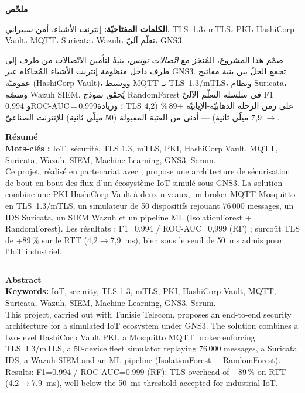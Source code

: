 \begin{center}
  \textbf{\normalsize \textarabic{ملخّص}}
\end{center}
\begin{Arabic}
\noindent\textbf{الكلمات المفتاحيّة:}
إنترنت الأشياء، أمن سيبراني، TLS~1.3، mTLS، PKI، HashiCorp Vault، MQTT، Suricata، Wazuh، تعلّم آليّ، GNS3.

\smallskip
\noindent صمّم هذا المشروع، المُنجَز مع \emph{اتّصالات تونس}، بنيةً لتأمين الاتّصالات من طرف إلى طرف داخل منظومة
إنترنت الأشياء المُحاكاة عبر GNS3. تجمع الحلّ بين بنية مفاتيح عموميّة (HashiCorp Vault)، ووسيط MQTT بـ TLS~1.3/mTLS،
ونظام Suricata، ومنصّة Wazuh SIEM. يُحقّق نموذج RandomForest في سلسلة التعلّم الآليّ
F1\,=\,0,994 وROC-AUC\,=\,0,999؛ وزيادة TLS على زمن الرحلة الذهابيّة-الإيابيّة +89\,\%
(4,2 $\to$ 7,9 ميلّي ثانية) — أدنى من العتبة المقبولة (50 ميلّي ثانية) للإنترنت الصناعيّ.
\end{Arabic}

\endgroup
\cleardoublepage
\thispagestyle{empty}
\pagestyle{empty}

\begingroup
\setlength{\parskip}{2pt}
\setlength{\parindent}{0pt}
\small

\noindent\textbf{\large Résumé}\\[2pt]
\textbf{Mots-clés :} IoT, sécurité, TLS 1.3, mTLS, PKI, HashiCorp Vault, MQTT, Suricata, Wazuh, SIEM, Machine Learning, GNS3, Scrum.\\[2pt]
Ce projet, réalisé en partenariat avec \TT{}, propose une architecture de sécurisation de bout en bout des flux d'un écosystème IoT simulé sous GNS3. La solution combine une PKI HashiCorp Vault à deux niveaux, un broker MQTT Mosquitto en TLS~1.3/mTLS, un simulateur de 50 dispositifs rejouant 76\,000 messages, un IDS Suricata, un SIEM Wazuh et un pipeline ML (IsolationForest + RandomForest). Les résultats : F1=0,994 / ROC-AUC=0,999 (RF) ; surcoût TLS de +89\,\% sur le RTT (4,2$\to$7,9~ms), bien sous le seuil de 50~ms admis pour l'IoT industriel.

\vspace{6pt}\hrule\vspace{6pt}

\noindent\textbf{\large Abstract}\\[2pt]
\textbf{Keywords:} IoT, security, TLS 1.3, mTLS, PKI, HashiCorp Vault, MQTT, Suricata, Wazuh, SIEM, Machine Learning, GNS3, Scrum.\\[2pt]
This project, carried out with Tunisie Telecom, proposes an end-to-end security architecture for a simulated IoT ecosystem under GNS3. The solution combines a two-level HashiCorp Vault PKI, a Mosquitto MQTT broker enforcing TLS~1.3/mTLS, a 50-device fleet simulator replaying 76\,000 messages, a Suricata IDS, a Wazuh SIEM and an ML pipeline (IsolationForest + RandomForest). Results: F1=0.994 / ROC-AUC=0.999 (RF); TLS overhead of +89\,\% on RTT (4.2$\to$7.9~ms), well below the 50~ms threshold accepted for industrial IoT.

